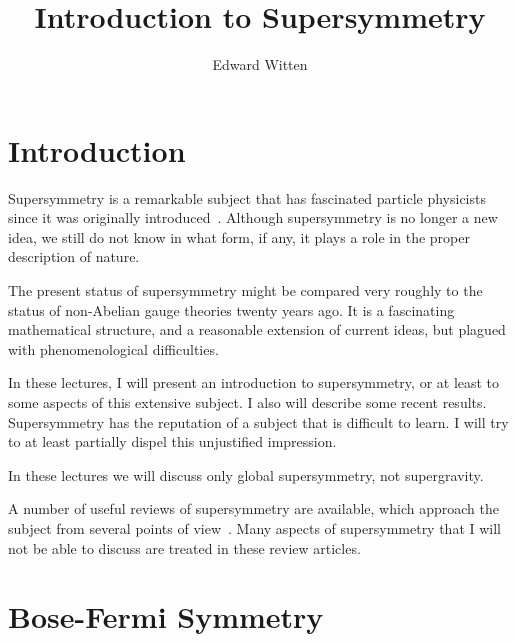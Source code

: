 \documentclass[11pt,a4paper]{article}
\title{Introduction to Supersymmetry}
\author{Edward Witten\note{Supported in part by NSF Grant PHY80-19754.}}
\affiliation{Joseph Henry Laboratories,\\
Princeton University,\\
Princeton, New Jersey 08544}
\begin{document}
\maketitle
\flushbottom

\section{Introduction}

Supersymmetry is a remarkable subject that has fascinated
particle physicists since it was originally introduced~\cite{ref1}.
Although supersymmetry is no longer a new idea, we still do not know in what
form, if any, it plays a role in the proper description of nature.

The present status of supersymmetry might be compared very
roughly to the status of non-Abelian gauge theories twenty years ago.
It is a fascinating mathematical structure, and a reasonable extension
of current ideas, but plagued with phenomenological difficulties.

In these lectures, I will present an introduction to supersymmetry,
or at least to some aspects of this extensive subject. I
also will describe some recent results. Supersymmetry has the reputation
of a subject that is difficult to learn. I will try to at
least partially dispel this unjustified impression.

In these lectures we will discuss only global supersymmetry,
not supergravity.

A number of useful reviews of supersymmetry are available,
which approach the subject from several points of view~\cite{ref2}.
Many aspects of supersymmetry that I will not be able to discuss are
treated in these review articles.

\section{Bose-Fermi Symmetry}
\end{document}
